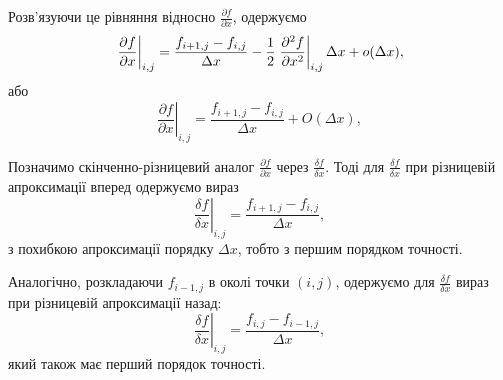 Розв'язуючи це рівняння відносно $\frac{\partial f}{\partial x}$, одержуємо
\begin{equation*}
    \left. \frac{\partial f}{\partial x} \right|_{i, j} = \frac{f_{i + 1, j} - f_{i, j}}{\Delta x} - \frac{1}{2} \left. \frac{\partial^2 f}{\partial x^2} \right|_{i, j} \Delta x + o(\Delta x),
\end{equation*}
або
\begin{equation}
    \label{eq:3.2}
    \left. \frac{\partial f}{\partial x} \right|_{i, j} = \frac{f_{i + 1, j} - f_{i, j}}{\Delta x} + O(\Delta x),
\end{equation}

\begin{th_formula}
    Позначимо скінченно-різницевий аналог $\frac{\partial f}{\partial x}$ через $\frac{\delta f}{\delta x}$. Тоді для $\frac{\delta f}{\delta x}$ при різницевій апроксимації вперед одержуємо вираз
    \begin{equation}
        \label{eq:3.3}
        \left. \frac{\delta f}{\delta x} \right|_{i, j} = \frac{f_{i + 1, j} - f_{i, j}}{\Delta x},
    \end{equation}
    з похибкою апроксимації порядку $\Delta x$, тобто з першим порядком точності. \medskip
\end{th_formula}

\begin{th_formula}
    Аналогічно, розкладаючи $f_{i - 1, j}$ в околі точки $(i, j)$, одержуємо для $\frac{\delta f}{\delta x}$ вираз при різницевій апроксимації назад:
    \begin{equation}
        \label{eq:3.4}
        \left. \frac{\delta f}{\delta x} \right|_{i, j} = \frac{f_{i, j} - f_{i - 1, j}}{\Delta x},
    \end{equation}
    який також має перший порядок точності. 
\end{th_formula}

